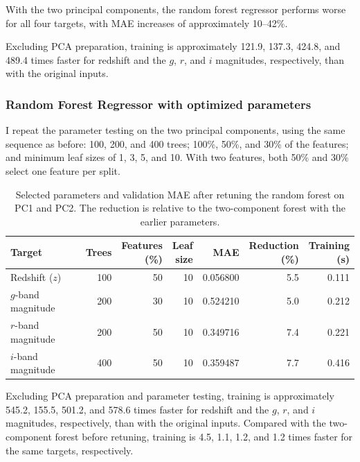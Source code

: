 \documentclass[12pt,a4paper]{article}
\begin{document}
With the two principal components, the random forest regressor performs worse for all four targets, with MAE increases of approximately 10--42\%.

Excluding PCA preparation, training is approximately 121.9, 137.3, 424.8, and 489.4 times faster for redshift and the $g$, $r$, and $i$ magnitudes, respectively, than with the original inputs.

\clearpage
\subsubsection{Random Forest Regressor with optimized parameters}

I repeat the parameter testing on the two principal components, using the same sequence as before: 100, 200, and 400 trees; 100\%, 50\%, and 30\% of the features; and minimum leaf sizes of 1, 3, 5, and 10. With two features, both 50\% and 30\% select one feature per split.

\begin{table}[htbp]
\centering
\small
\setlength{\tabcolsep}{3pt}
\caption{Selected parameters and validation MAE after retuning the random forest on PC1 and PC2. The reduction is relative to the two-component forest with the earlier parameters.}
\label{tab:pca-retuned-forest}
\begin{tabular}{lrrrrrr}
\toprule
Target & Trees & \shortstack{Features\\(\%)} & \shortstack{Leaf\\size} & MAE & \shortstack{Reduction\\(\%)} & \shortstack{Training\\(s)} \\
\midrule
Redshift ($z$) & 100 & 50 & 10 & 0.056800 & 5.5 & 0.111 \\
$g$-band magnitude & 200 & 30 & 10 & 0.524210 & 5.0 & 0.212 \\
$r$-band magnitude & 200 & 50 & 10 & 0.349716 & 7.4 & 0.221 \\
$i$-band magnitude & 400 & 50 & 10 & 0.359487 & 7.7 & 0.416 \\
\bottomrule
\end{tabular}
\end{table}


Excluding PCA preparation and parameter testing, training is approximately 545.2, 155.5, 501.2, and 578.6 times faster for redshift and the $g$, $r$, and $i$ magnitudes, respectively, than with the original inputs. Compared with the two-component forest before retuning, training is 4.5, 1.1, 1.2, and 1.2 times faster for the same targets, respectively.
\end{document}
